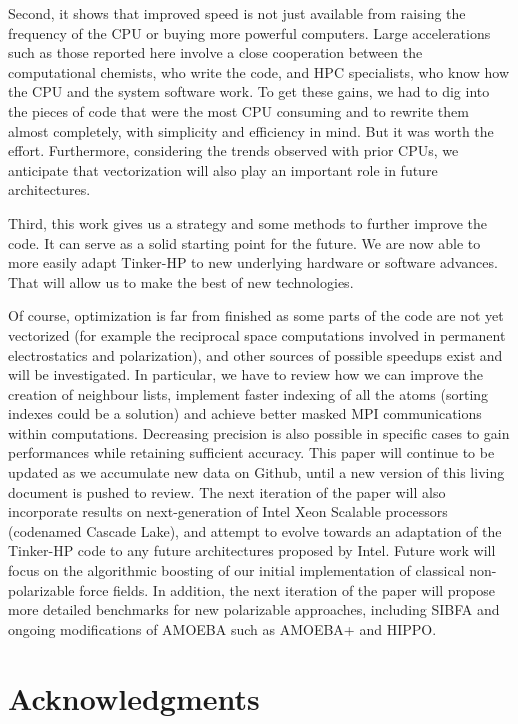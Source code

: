 \documentclass[9pt,comparison]{livecoms}
\begin{document}
Second, it shows that improved speed is not just available from raising the frequency of the CPU or buying more powerful computers. Large accelerations such as those reported here involve a close cooperation between the computational chemists, who write the code, and HPC specialists, who know how the CPU and the system software work. To get these gains, we had to dig into the pieces of code that were the most CPU consuming and to rewrite them almost completely, with simplicity and efficiency in mind. But it was worth the effort. Furthermore, considering the trends observed with prior CPUs, we anticipate that vectorization will also play an important role in future architectures.

Third, this work gives us a strategy and some methods to further improve the code. It can serve as a solid starting point for the future. We are now able to more easily adapt Tinker-HP to new underlying hardware or software advances. That will allow us to make the best of new technologies.

Of course, optimization is far from finished as some parts of the code are not yet vectorized (for example the reciprocal space computations involved in permanent electrostatics and polarization), and other sources of possible speedups exist and will be investigated. In particular, we have to review how we can improve the creation of neighbour lists, implement faster indexing of all the atoms (sorting indexes could be a solution) and achieve better masked MPI communications within computations. Decreasing precision is also possible in specific cases to gain performances while retaining sufficient accuracy. This paper will continue to be updated as we accumulate new data on Github, until a new version of this living document is pushed to review. The next iteration of the paper will also incorporate results on next-generation of Intel Xeon Scalable processors (codenamed Cascade Lake), and attempt to evolve towards an adaptation of the Tinker-HP code to any future architectures proposed by Intel. Future work will focus on the algorithmic boosting of our initial implementation of classical non-polarizable force fields. In addition, the next iteration of the paper will propose more detailed benchmarks for new polarizable approaches, including SIBFA \cite{gresh2007anisotropic,SIBFAjpp} and ongoing modifications of AMOEBA such as AMOEBA+\cite{AMOEBA+} and HIPPO\cite{electrohippo,hippoexchange}. 
\section{Acknowledgments}
%
\end{document}
